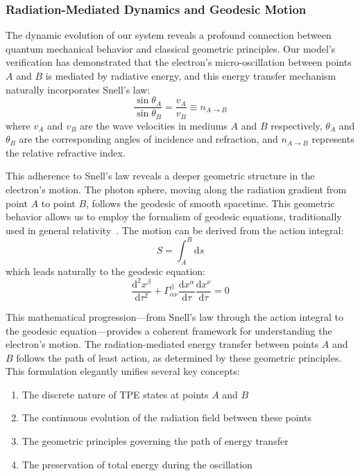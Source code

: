 \documentclass[%
 reprint,
 amsmath,amssymb,
 aps,
]{revtex4-1}
\numberwithin{equation}{section}%
\begin{document}
\subsubsection{\label{sec:Radiation-Mediated Dynamics and}Radiation-Mediated Dynamics and Geodesic Motion}

The dynamic evolution of our system reveals a profound connection between quantum mechanical behavior and classical geometric principles. Our model's verification has demonstrated that the electron's micro-oscillation between points $A$ and $B$ is mediated by radiative energy, and this energy transfer mechanism naturally incorporates Snell's law:
\begin{equation}
\frac{\sin \theta_A}{\sin \theta_B} = \frac{v_A}{v_B} \equiv n_{A\rightarrow B}
\label{eq:snells_law}
\end{equation}
where $v_A$ and $v_B$ are the wave velocities in mediums $A$ and $B$ respectively, $\theta_A$ and $\theta_B$ are the corresponding angles of incidence and refraction, and $n_{A\rightarrow B}$ represents the relative refractive index.

This adherence to Snell's law reveals a deeper geometric structure in the electron's motion. The photon sphere, moving along the radiation gradient from point $A$ to point $B$, follows the geodesic of smooth spacetime. This geometric behavior allows us to employ the formalism of geodesic equations, traditionally used in general relativity~\cite{dewitt1975, birrell1984}. The motion can be derived from the action integral:
\begin{equation}
S = \int_{A}^{B} \mathrm{d}s
\label{eq:action_integral}
\end{equation}
which leads naturally to the geodesic equation:
\begin{equation}
    \frac{\mathrm{d}^2 x^\beta}{\mathrm{d}\tau^2} + \Gamma^\beta_{\alpha\nu}\frac{\mathrm{d}x^\alpha}{\mathrm{d}\tau}\frac{\mathrm{d}x^\nu}{\mathrm{d}\tau} = 0
    \label{eq:geodesic_equation}
\end{equation}

This mathematical progression—from Snell's law through the action integral to the geodesic equation—provides a coherent framework for understanding the electron's motion. The radiation-mediated energy transfer between points $A$ and $B$ follows the path of least action, as determined by these geometric principles. This formulation elegantly unifies several key concepts:

\begin{enumerate}
\item The discrete nature of TPE states at points $A$ and $B$
\item The continuous evolution of the radiation field between these points
\item The geometric principles governing the path of energy transfer
\item The preservation of total energy during the oscillation
\end{enumerate}
\end{document}
